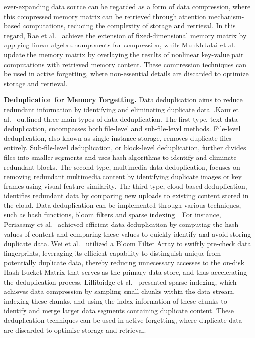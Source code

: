 \documentclass[journal,hideappendix]{vgtc}
\newenvironment{j_itemize}{
\begin{itemize}[]
  \setlength{\itemsep}{3pt}
  \setlength{\parskip}{0pt}
  \setlength{\parsep}{0pt}
}{\end{itemize}}
\begin{document}
\begin{j_itemize}
ever-expanding data source can be regarded as a form of data compression, where this compressed memory matrix can be retrieved through attention mechanism-based computations, reducing the complexity of storage and retrieval. In this regard, Rae et al.~\cite{rae2019compressive} achieve the extension of fixed-dimensional memory matrix by applying linear algebra components for compression, while Munkhdalai et al.~\cite{munkhdalai2024leave} update the memory matrix by overlaying the results of nonlinear key-value pair computations with retrieved memory content. These compression techniques can be used in active forgetting, where non-essential details are discarded to optimize storage and retrieval.

    \item[$\bullet$] \textbf{Deduplication for Memory Forgetting.} Data deduplication aims to reduce redundant information by identifying and eliminating duplicate data~\cite{xia2016comprehensive,kaur2018data}.Kaur et al.~\cite{kaur2018data} outlined three main types of data deduplication. The first type, text data deduplication, encompasses both file-level and sub-file-level methods. File-level deduplication, also known as single instance storage, removes duplicate files entirely. Sub-file-level deduplication, or block-level deduplication, further divides files into smaller segments and uses hash algorithms to identify and eliminate redundant blocks. 
    The second type, multimedia data deduplication, focuses on removing redundant multimedia content by identifying duplicate images or key frames using visual feature similarity. 
    The third type, cloud-based deduplication, identifies redundant data by comparing new uploads to existing content stored in the cloud. Data deduplication can be implemented through various techniques, such as hash functions, bloom filters and sparse indexing~\cite{xia2016comprehensive}. For instance, Periasamy et al.~\cite{periasamy2021efficient} achieved efficient data deduplication by computing the hash values of content and comparing these values to quickly identify and avoid storing duplicate data. Wei et al.~\cite{wei2010mad2} utilized a Bloom Filter Array to swiftly pre-check data fingerprints, leveraging its efficient capability to distinguish unique from potentially duplicate data, thereby reducing unnecessary accesses to the on-disk Hash Bucket Matrix that serves as the primary data store, and thus accelerating the deduplication process. Lillibridge et al.~\cite{lillibridge2009sparse} presented sparse indexing, which achieves data compression by sampling small chunks within the data stream, indexing these chunks, and using the index information of these chunks to identify and merge larger data segments containing duplicate content. These deduplication techniques can be used in active forgetting, where duplicate data are discarded to optimize storage and retrieval.
    
\end{j_itemize}
\end{document}
